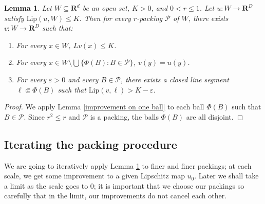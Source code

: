 \documentclass[reqno,11pt]{amsart}
\newcommand{\RR}{\mathbf{R}}
\newcommand{\Lip}{\mathrm{Lip}}
\newtheorem{lemma}[theorem]{Lemma}
\theoremstyle{definition}
\numberwithin{equation}{section}
\begin{document}
\begin{lemma}\label{improvement on packing}
Let $W \subseteq \RR^d$ be an open set, $K > 0$, and $0 < r \leq 1$.
Let $u: W \to \RR^D$ satisfy $\Lip(u, W) \leq K$.
Then for every $r$-packing $\mathscr P$ of $W$, there exists $v: W \to \RR^D$ such that:
\begin{enumerate}
\item For every $x \in W$, $Lv(x) \leq K$.
\item For every $x \in W \setminus \bigcup \{\Phi(B): B \in \mathscr P\}$, $v(y) = u(y)$.
\item For every $\varepsilon > 0$ and every $B \in \mathscr P$, there exists a closed line segment $\ell \Subset \Phi(B)$ such that $\Lip(v, \ell) > K - \varepsilon$.
\end{enumerate}
\end{lemma}
\begin{proof}
We apply Lemma \ref{improvement on one ball} to each ball $\Phi(B)$ such that $B \in \mathscr P$.
Since $r^2 \leq r$ and $\mathscr P$ is a packing, the balls $\Phi(B)$ are all disjoint.
\end{proof}

\subsection{Iterating the packing procedure}
We are going to iteratively apply Lemma \ref{improvement on packing} to finer and finer packings; at each scale, we get some improvement to a given Lipschitz map $u_0$.
Later we shall take a limit as the scale goes to $0$; it is important that we choose our packings so carefully that in the limit, our improvements do not cancel each other.
\end{document}
